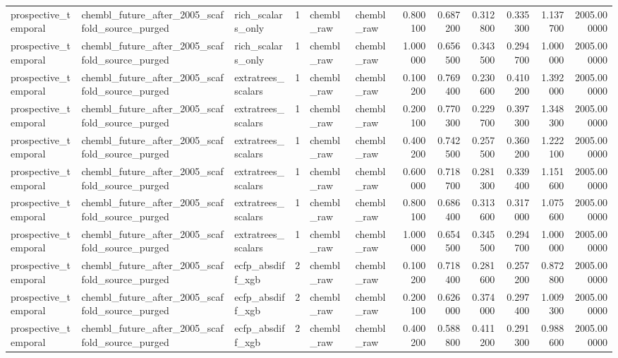 \begin{longtable}{lllrllrrrrrr}
prospective\_temporal & chembl\_future\_after\_2005\_scaffold\_source\_purged & rich\_scalars\_only & 1 & chembl\_raw & chembl\_raw & 0.800100 & 0.687200 & 0.312800 & 0.335300 & 1.137700 & 2005.000000 \\
prospective\_temporal & chembl\_future\_after\_2005\_scaffold\_source\_purged & rich\_scalars\_only & 1 & chembl\_raw & chembl\_raw & 1.000000 & 0.656500 & 0.343500 & 0.294700 & 1.000000 & 2005.000000 \\
prospective\_temporal & chembl\_future\_after\_2005\_scaffold\_source\_purged & extratrees\_scalars & 1 & chembl\_raw & chembl\_raw & 0.100200 & 0.769400 & 0.230600 & 0.410200 & 1.392000 & 2005.000000 \\
prospective\_temporal & chembl\_future\_after\_2005\_scaffold\_source\_purged & extratrees\_scalars & 1 & chembl\_raw & chembl\_raw & 0.200100 & 0.770300 & 0.229700 & 0.397300 & 1.348300 & 2005.000000 \\
prospective\_temporal & chembl\_future\_after\_2005\_scaffold\_source\_purged & extratrees\_scalars & 1 & chembl\_raw & chembl\_raw & 0.400200 & 0.742500 & 0.257500 & 0.360200 & 1.222100 & 2005.000000 \\
prospective\_temporal & chembl\_future\_after\_2005\_scaffold\_source\_purged & extratrees\_scalars & 1 & chembl\_raw & chembl\_raw & 0.600000 & 0.718700 & 0.281300 & 0.339400 & 1.151600 & 2005.000000 \\
prospective\_temporal & chembl\_future\_after\_2005\_scaffold\_source\_purged & extratrees\_scalars & 1 & chembl\_raw & chembl\_raw & 0.800100 & 0.686400 & 0.313600 & 0.317000 & 1.075600 & 2005.000000 \\
prospective\_temporal & chembl\_future\_after\_2005\_scaffold\_source\_purged & extratrees\_scalars & 1 & chembl\_raw & chembl\_raw & 1.000000 & 0.654500 & 0.345500 & 0.294700 & 1.000000 & 2005.000000 \\
prospective\_temporal & chembl\_future\_after\_2005\_scaffold\_source\_purged & ecfp\_absdiff\_xgb & 2 & chembl\_raw & chembl\_raw & 0.100200 & 0.718400 & 0.281600 & 0.257200 & 0.872800 & 2005.000000 \\
prospective\_temporal & chembl\_future\_after\_2005\_scaffold\_source\_purged & ecfp\_absdiff\_xgb & 2 & chembl\_raw & chembl\_raw & 0.200100 & 0.626000 & 0.374000 & 0.297400 & 1.009300 & 2005.000000 \\
prospective\_temporal & chembl\_future\_after\_2005\_scaffold\_source\_purged & ecfp\_absdiff\_xgb & 2 & chembl\_raw & chembl\_raw & 0.400200 & 0.588800 & 0.411200 & 0.291300 & 0.988600 & 2005.000000 \\

\end{longtable}
